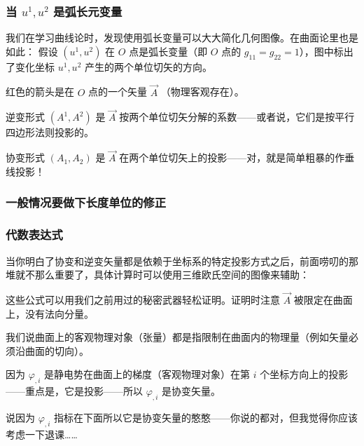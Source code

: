 \documentclass[CJK,13pt]{beamer}
\begin{document}
\begin{frame}
  \frametitle{当 $u^1, u^2$ 是弧长元变量}

  \skipline
  
  {\small 我们在学习曲线论时，发现使用弧长变量可以大大简化几何图像。在曲面论里也是如此：  }
  \emini
  \hspace{0.1in}
  {\small 假设 $(u^1, u^2)$ 在 $O$ 点是弧长变量（即 $O$ 点的 $g_{11}= g_{22}= 1$），图中标出了变化坐标 $u^1, u^2$ 产生的两个单位切矢的方向。}

  红色的箭头是在 $O$ 点的一个矢量 $\vec{A}$ （物理客观存在）。
  
  \skipline
  
{\blue  逆变形式 $(A^1, A^2)$ 是 $\vec{A}$ 按两个单位切矢分解的系数——或者说，它们是按平行四边形法则投影的。}

  \skipline

 {\blue 协变形式 $(A_1, A_2)$ 是 $\vec{A}$ 在两个单位切矢上的投影——对，就是简单粗暴的作垂线投影！}
  
  
  \emini
\end{frame}


\begin{frame}
  \frametitle{一般情况要做下长度单位的修正}
\end{frame}

\begin{frame}
  \frametitle{代数表达式}
  当你明白了协变和逆变矢量都是依赖于坐标系的特定投影方式之后，前面唠叨的那堆就不那么重要了，具体计算时可以使用三维欧氏空间的图像来辅助：


  这些公式可以用我们之前用过的秘密武器轻松证明。证明时注意 $\vec{A}$ 被限定在曲面上，没有法向分量。

  \emini
        {\blue 我们说曲面上的客观物理对象（张量）都是指限制在曲面内的物理量（例如矢量必须沿曲面的切向）。}
        \emini
\end{frame}



\begin{frame}
  
  
因为 $\varphi_{,i}$ 是静电势在曲面上的梯度（客观物理对象）在第 $i$ 个坐标方向上的投影——重点是，它是投影——所以 $\varphi_{,i}$ 是协变矢量。


\skiplines

{\scriptsize 说因为  $\varphi_{,i}$ 指标在下面所以它是协变矢量的憨憨——你说的都对，但我觉得你应该考虑一下退课……}

\end{frame}
\end{document}
